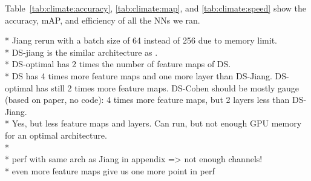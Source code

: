 \documentclass{article} %
\newcommand{\todo}[1]{{\color[rgb]{.6,.1,.6}{#1}}}
\newcommand{\Tabref}[1]{Table~\ref{tab:#1}}
\begin{document}
\Tabref{climate:accuracy}, \ref{tab:climate:map}, and \ref{tab:climate:speed} show the accuracy, mAP, and efficiency of all the NNs we ran.

* Jiang rerun with a batch size of 64 instead of 256 due to memory limit.\\
* DS-jiang is the similar architecture as \cite{jiang2019sphericalcnn}. \\
* DS-optimal has 2 times the number of feature maps of DS. \\
* \todo{What is DS and DS-Cohen?} DS has 4 times more feature maps and one more layer than DS-Jiang. DS-optimal has still 2 times more feature maps. DS-Cohen should be mostly gauge (based on paper, no code): 4 times more feature maps, but 2 layers less than DS-Jiang. \\
* \todo{Is (equi non-weighted) the full resolution?} Yes, but less feature maps and layers. Can run, but not enough GPU memory for an optimal architecture. \\
* \todo{check column order for DS} \\
* perf with same arch as Jiang in appendix => not enough channels!\\
* even more feature maps give us one more point in perf\\

\end{document}
